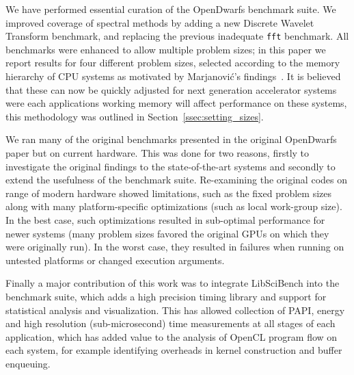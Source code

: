 \documentclass[../document.tex]{subfiles}
\begin{document}
\label{sec:conclusions}

We have performed essential curation of the OpenDwarfs benchmark suite.
We improved coverage of spectral methods by adding a new Discrete Wavelet Transform benchmark, and replacing the previous inadequate {\tt fft} benchmark.
All benchmarks were enhanced to allow multiple problem sizes; in this paper we report results for four different problem sizes, selected according to the memory hierarchy of CPU systems as motivated by Marjanovi{\'c}'s findings~\cite{marjanovic2016hpc}.
It is believed that these can now be quickly adjusted for next generation accelerator systems were each applications working memory will affect performance on these systems, this methodology was outlined in Section~\ref{ssec:setting_sizes}.

We ran many of the original benchmarks presented in the original OpenDwarfs~\cite{krommydas2016opendwarfs} paper but on current hardware.
This was done for two reasons, firstly to investigate the original findings to the state-of-the-art systems and secondly to extend the usefulness of the benchmark suite.
Re-examining the original codes on range of modern hardware showed limitations, such as the fixed problem sizes along with many platform-specific optimizations (such as local work-group size).
In the best case, such optimizations resulted in sub-optimal performance for newer systems (many problem sizes favored the original GPUs on which they were originally run).
In the worst case, they resulted in failures when running on untested platforms or changed execution arguments.

Finally a major contribution of this work was to integrate LibSciBench into the benchmark suite, which adds a high precision timing library and support for statistical analysis and visualization.
This has allowed collection of PAPI, energy and high resolution (sub-microsecond) time measurements at all stages of each application, which has added value to the analysis of OpenCL program flow on each system, for example identifying overheads in kernel construction and buffer enqueuing.
\end{document}
